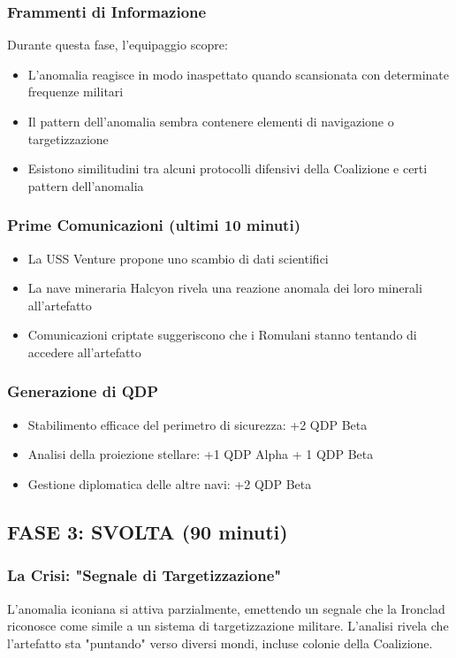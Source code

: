 \documentclass[letterpaper,twocolumn,openany,nodeprecatedcode]{dndbook}
\begin{document}
\subsubsection{Frammenti di Informazione}
Durante questa fase, l'equipaggio scopre:

\begin{itemize}
    \item L'anomalia reagisce in modo inaspettato quando scansionata con determinate frequenze militari
    \item Il pattern dell'anomalia sembra contenere elementi di navigazione o targetizzazione
    \item Esistono similitudini tra alcuni protocolli difensivi della Coalizione e certi pattern dell'anomalia
\end{itemize}

\subsubsection{Prime Comunicazioni (ultimi 10 minuti)}

\begin{itemize}
    \item La USS Venture propone uno scambio di dati scientifici
    \item La nave mineraria Halcyon rivela una reazione anomala dei loro minerali all'artefatto
    \item Comunicazioni criptate suggeriscono che i Romulani stanno tentando di accedere all'artefatto
\end{itemize}

\subsubsection{Generazione di QDP}

\begin{itemize}
    \item Stabilimento efficace del perimetro di sicurezza: +2 QDP Beta
    \item Analisi della proiezione stellare: +1 QDP Alpha + 1 QDP Beta
    \item Gestione diplomatica delle altre navi: +2 QDP Beta
\end{itemize}

\subsection{FASE 3: SVOLTA (90 minuti)}
\subsubsection{La Crisi: "Segnale di Targetizzazione"}
L'anomalia iconiana si attiva parzialmente, emettendo un segnale che la Ironclad riconosce come simile a un sistema di targetizzazione militare. L'analisi rivela che l'artefatto sta "puntando" verso diversi mondi, incluse colonie della Coalizione.
\end{document}
